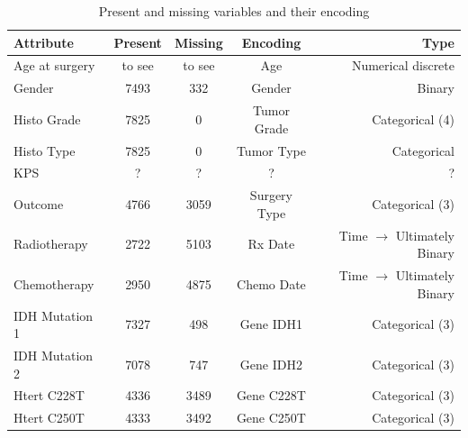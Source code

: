 \documentclass[a4paper]{article}
\begin{document}



\begin{table}[tb]
\vskip 3mm
\begin{center}
\begin{small}
\begin{sc}
\begin{tabular}{lcccr}
\hline
Attribute & Present & Missing & Encoding &Type \\
\hline
Age at surgery & to see & to see& Age & Numerical discrete  \\%
Gender  & 7493 & 332 & Gender & Binary\\
Histo Grade    & 7825& 0&  Tumor Grade & Categorical (4)      \\
Histo Type    & 7825& 0&  Tumor Type & Categorical   \\
KPS    & ?& ?&  ?  &?    \\
Outcome & 4766 & 3059 & Surgery Type & Categorical (3)\\
Radiotherapy    & 2722& 5103&  Rx Date  & Time $\to$ Ultimately Binary \\
Chemotherapy   & 2950& 4875&  Chemo Date  &Time $\to$ Ultimately Binary    \\
IDH Mutation 1   & 7327& 498&  Gene IDH1 & Categorical (3)   \\
IDH Mutation 2   &7078 & 747&  Gene IDH2   & Categorical (3) \\
Htert C228T & 4336 & 3489 & Gene C228T & Categorical (3)\\ 
Htert C250T & 4333 & 3492 & Gene C250T  & Categorical (3) \\ 
\hline
\end{tabular}
\end{sc}
\end{small}
\caption{Present and missing variables and their encoding}
\label{tab:encoding}
\end{center}
\vskip -3mm
\end{table}
\end{document}
